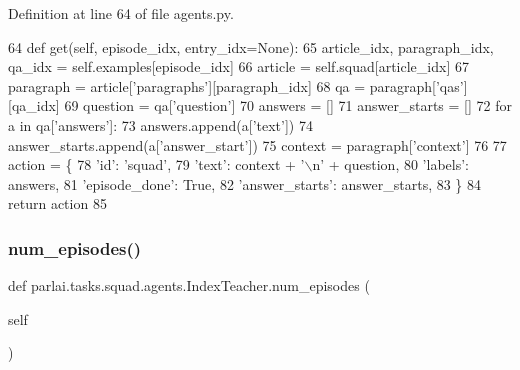 Definition at line 64 of file agents.\+py.


\begin{DoxyCode}
64     \textcolor{keyword}{def }get(self, episode\_idx, entry\_idx=None):
65         article\_idx, paragraph\_idx, qa\_idx = self.examples[episode\_idx]
66         article = self.squad[article\_idx]
67         paragraph = article[\textcolor{stringliteral}{'paragraphs'}][paragraph\_idx]
68         qa = paragraph[\textcolor{stringliteral}{'qas'}][qa\_idx]
69         question = qa[\textcolor{stringliteral}{'question'}]
70         answers = []
71         answer\_starts = []
72         \textcolor{keywordflow}{for} a \textcolor{keywordflow}{in} qa[\textcolor{stringliteral}{'answers'}]:
73             answers.append(a[\textcolor{stringliteral}{'text'}])
74             answer\_starts.append(a[\textcolor{stringliteral}{'answer\_start'}])
75         context = paragraph[\textcolor{stringliteral}{'context'}]
76 
77         action = \{
78             \textcolor{stringliteral}{'id'}: \textcolor{stringliteral}{'squad'},
79             \textcolor{stringliteral}{'text'}: context + \textcolor{stringliteral}{'\(\backslash\)n'} + question,
80             \textcolor{stringliteral}{'labels'}: answers,
81             \textcolor{stringliteral}{'episode\_done'}: \textcolor{keyword}{True},
82             \textcolor{stringliteral}{'answer\_starts'}: answer\_starts,
83         \}
84         \textcolor{keywordflow}{return} action
85 
\end{DoxyCode}
\mbox{\label{classparlai_1_1tasks_1_1squad_1_1agents_1_1IndexTeacher_aeab5882318ba27f0ff15a0bc649fff0b}} 
\subsubsection{\texorpdfstring{num\+\_\+episodes()}{num\_episodes()}}
{\footnotesize\ttfamily def parlai.\+tasks.\+squad.\+agents.\+Index\+Teacher.\+num\+\_\+episodes (\begin{DoxyParamCaption}\item[{}]{self }\end{DoxyParamCaption})}



